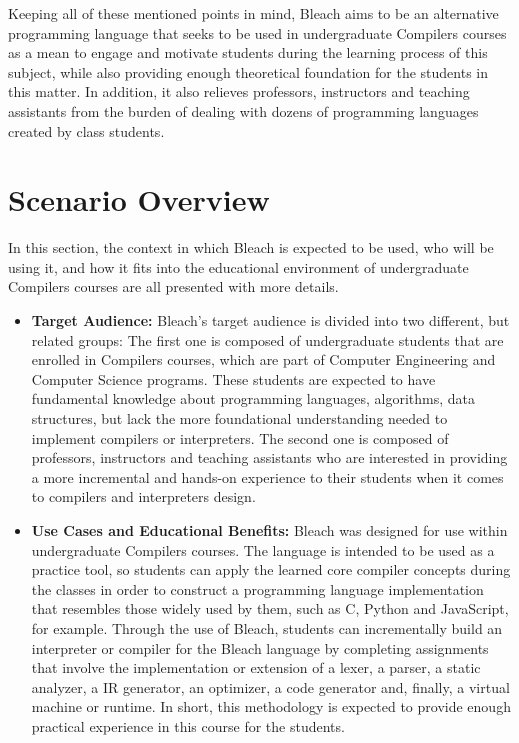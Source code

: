 Keeping all of these mentioned points in mind, Bleach aims to be an alternative programming language that seeks to be used in undergraduate Compilers courses as a mean to engage and motivate students during the learning process of this subject, while also providing enough theoretical foundation for the students in this matter. In addition, it also relieves professors, instructors and teaching assistants from the burden of dealing with dozens of programming languages created by class students.

\section{Scenario Overview}
In this section, the context in which Bleach is expected to be used, who will be using it, and how it fits into the educational environment of undergraduate Compilers courses are all presented with more details.

\begin{itemize}
    \item \textbf{Target Audience:} Bleach's target audience is divided into two different, but related groups: The first one is composed of undergraduate students that are enrolled in Compilers courses, which are part of Computer Engineering and Computer Science programs. These students are expected to have fundamental knowledge about programming languages, algorithms, data structures, but lack the more foundational understanding needed to implement compilers or interpreters. The second one is composed of professors, instructors and teaching assistants who are interested in providing a more incremental and hands-on experience to their students when it comes to compilers and interpreters design.
    
    \item \textbf{Use Cases and Educational Benefits:} Bleach was designed for use within undergraduate Compilers courses. The language is intended to be used as a practice tool, so students can apply the learned core compiler concepts during the classes in order to construct a programming language implementation that resembles those widely used by them, such as C, Python and JavaScript, for example. Through the use of Bleach, students can incrementally build an interpreter or compiler for the Bleach language by completing assignments that involve the implementation or extension of a lexer, a parser, a static analyzer, a IR generator, an optimizer, a code generator and, finally, a virtual machine or runtime. In short, this methodology is expected to provide enough practical experience in this course for the students.
    
\end{itemize}
